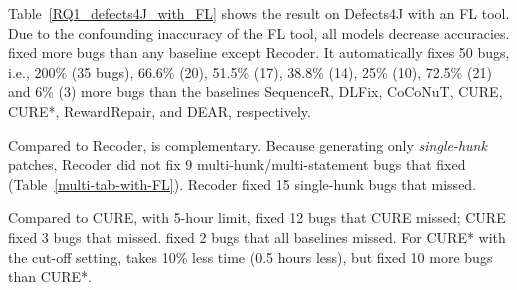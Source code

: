 Table~\ref{RQ1_defects4J_with_FL} shows the result on Defects4J with
an FL tool. Due to the confounding inaccuracy of the FL tool, all
models decrease accuracies. {\tool} fixed more bugs than any baseline
except Recoder. It automatically fixes 50 bugs, i.e., 200\% (35 bugs),
66.6\% (20), 51.5\% (17), 38.8\% (14), 25\% (10), 72.5\% (21) and
6\% (3) more bugs than the baselines SequenceR, DLFix, CoCoNuT, CURE,
CURE*, RewardRepair, and DEAR, respectively.

Compared to Recoder, {\tool} is complementary. Because
generating only {\em single-hunk} patches, Recoder did not fix 9
multi-hunk/multi-statement bugs that {\tool} fixed
(Table~\ref{multi-tab-with-FL}). Recoder fixed 15 single-hunk bugs that {\tool} missed.

Compared to CURE, with 5-hour limit, {\tool} fixed 12 bugs that CURE
missed; CURE fixed 3 bugs that {\tool} missed. {\tool} fixed 2 bugs
that all baselines missed. For CURE* with the cut-off setting, {\tool}
takes 10\% less time (0.5 hours less), but fixed 10 more bugs than
CURE*.




%






